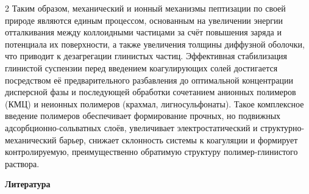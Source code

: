 \begin{multicols}{2}
Таким образом, механический и ионный механизмы пептизации по своей
природе являются единым процессом, основанным на увеличении энергии
отталкивания между коллоидными частицами за счёт повышения заряда и
потенциала их поверхности, а также увеличения толщины диффузной
оболочки, что приводит к дезагрегации глинистых частиц. Эффективная
стабилизация глинистой суспензии перед введением коагулирующих солей
достигается посредством её предварительного разбавления до оптимальной
концентрации дисперсной фазы и последующей обработки сочетанием анионных
полимеров (КМЦ) и неионных полимеров (крахмал,
лигносульфонаты). Такое комплексное введение полимеров
обеспечивает формирование прочных, но подвижных адсорбционно-сольватных
слоёв, увеличивает электростатический и структурно-механический барьер,
снижает склонность системы к коагуляции и формирует контролируемую,
преимущественно обратимую структуру полимер-глинистого раствора.
\end{multicols}

\begin{center}
{\bfseries Литература}
\end{center}

